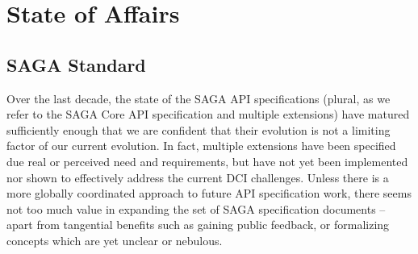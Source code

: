 \documentclass{article}
\newcommand{\I}[1]{\textit{#1}}
\newcommand{\B}[1]{\textbf{#1}}
\newcommand{\todo}[1]{{\textcolor{red}{\B{TODO:} #1 }}}
\newcommand{\jhanote}[1]{{\textcolor{red}{     \B{Shantenu:} #1 }}}
\newcommand{\jhanote}[1]{}
\begin{document}



  


\section{State of Affairs}
\label{sec:state}


\subsection{SAGA Standard}

  Over the last decade, the state of the SAGA API specifications
  (plural, as we refer to the SAGA Core API specification and multiple
  extensions) have matured sufficiently enough that we are confident
  that their evolution is not a limiting factor of our current
  evolution.  In fact, multiple extensions have been specified due
  real or perceived need and requirements, but have not yet been
  implemented nor shown to effectively address the current DCI
  challenges.  Unless there is a more globally coordinated approach to
  future API specification work, there seems not too much value in
  expanding the set of SAGA specification documents -- apart from
  tangential benefits such as gaining public feedback, or formalizing
  concepts which are yet unclear or nebulous.
\end{document}
